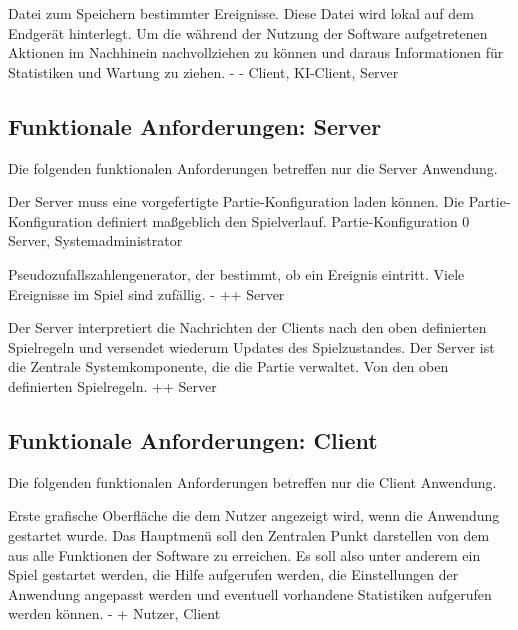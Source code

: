         {Datei zum Speichern bestimmter Ereignisse. Diese Datei wird lokal auf dem Endgerät hinterlegt.}
        {Um die während der Nutzung der Software aufgetretenen Aktionen im Nachhinein nachvollziehen zu können und daraus Informationen für Statistiken und Wartung zu ziehen.}
        {-}
        {-}
        {Client, KI-Client, Server}
        

\subsection{Funktionale Anforderungen: Server}

Die folgenden funktionalen Anforderungen betreffen nur die Server Anwendung.
        
        {Der Server muss eine vorgefertigte Partie-Konfiguration laden können.}
        {Die Partie-Konfiguration definiert maßgeblich den Spielverlauf.}
        {Partie-Konfiguration}
        {0}
        {Server, Systemadministrator}

        {Pseudozufallszahlengenerator, der bestimmt, ob ein Ereignis eintritt.}
        {Viele Ereignisse im Spiel sind zufällig.}
        {-}
        {++}
        {Server}
        
        {Der Server interpretiert die Nachrichten der Clients nach den oben definierten Spielregeln und versendet wiederum Updates des Spielzustandes.}
        {Der Server ist die Zentrale Systemkomponente, die die Partie verwaltet.}
        {Von den oben definierten Spielregeln.}
        {++}
        {Server}
        

\subsection{Funktionale Anforderungen: Client}

Die folgenden funktionalen Anforderungen betreffen nur die Client Anwendung.

        {Erste grafische Oberfläche die dem Nutzer angezeigt wird, wenn die Anwendung gestartet wurde.}
        {Das Hauptmenü soll den Zentralen Punkt darstellen von dem aus alle Funktionen der Software zu erreichen. Es soll also unter anderem ein Spiel gestartet werden, die Hilfe aufgerufen werden, die Einstellungen der Anwendung angepasst werden und eventuell vorhandene Statistiken aufgerufen werden können.}
        {-}
        {+}
        {Nutzer, Client}

